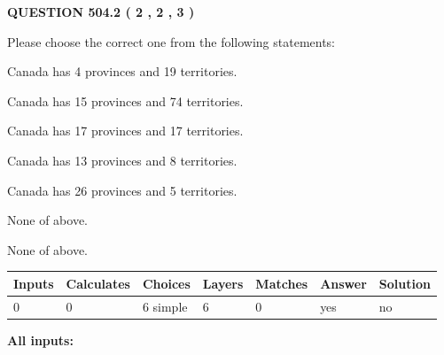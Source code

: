 \documentclass[12pt]{article}
\begin{document}
   
  
\vspace{0.2in}
  
{\textbf{\Large{QUESTION
504.2 
 ( 2 , 2 , 3 )
}}}
  
  
Please choose the correct one from the following statements:
 
 
Canada has   4 provinces and  19 territories.
 
 
Canada has  15 provinces and  74 territories.
 
 
Canada has  17 provinces and  17 territories.
 
 
Canada has  13 provinces and  8 territories.
 
 
Canada has  26 provinces and  5 territories.
 
 
 None of above.
 
 
\noindent{}
 
 
 None of above.
 
 
\noindent{}
 
 
   
   
   
   
\noindent\begin{tabular}{|l|l|l|l|l|l|l|}
 \hline
Inputs & Calculates & Choices & Layers & Matches & Answer & Solution \\ \hline
 0  & 
 0  & 
 6
  simple  
  & 
 6  & 
 0  & 
  yes & 
  no 
  \\ \hline
 \end{tabular}
   
   
   
   
\noindent{}
   
   
   
   
\noindent\vspace{0.1in}\hspace{-0.08in} {\textbf{\Large{All inputs: }}}
   
   
   
   
   
   
 \vspace{0.2in}
 
\end{document}
